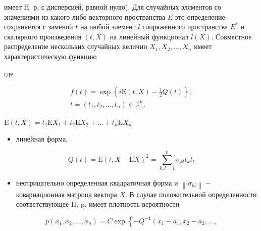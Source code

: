 \documentclass[10pt]{article}
\begin{document}
имеет Н. р. с дисперсией, равной нулю). Для случайных элсментов со значениями из какого-либо векторного пространства $E$ это определение сохраняется с заменой $t$ на любой элемент $l$ сопряженного пространства $E^{*}$ и скалярного произведения $(t, X)$ на линейный функционал $l(X)$. Совместное распределение нескольких случайных величин $X_{1}, X_{2}, \ldots, X_{n}$ имеет характеристическую функцию



где



\[

\begin{gathered}

f(t)=\exp \left\{i \mathrm{E}(t, X)-\frac{1}{2} Q(t)\right\}, \\

t=\left(t_{1}, t_{2}, \ldots, t_{n}\right) \in \mathbb{R}^{n},

\end{gathered}

\]



$\mathrm{E}(t, X)=t_{1} \mathrm{E} X_{1}+t_{2} \mathrm{E} X_{2}+\ldots+t_{n} \mathrm{E} X_{n}$



\begin{itemize}

  \item линейная форма,

\end{itemize}



\[

Q(t)=\mathrm{E}(t, X-\mathrm{E} X)^{2}=\sum_{k, l=1}^{n} \sigma_{k l} t_{k} t_{l}

\]



\begin{itemize}

  \item неотрицательно определенная квадратичная форма и $\left\|\sigma_{k l}\right\|-$ ковариационная матрица вектора $X$. В случае положительной определенности соответствующее H. p. имеет плотность всроятности

\end{itemize}



\[

p\left(x_{1}, x_{2}, \ldots, x_{n}\right)=C \exp \left\{-Q^{-1}\left(x_{1}-a_{1}, x_{2}-a_{2}, \ldots,\right.\right.

\]
\end{document}
